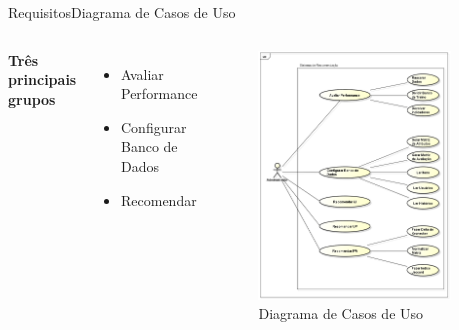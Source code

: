 \begin{frame}{Requisitos}{Diagrama de Casos de Uso}
\begin{columns}[c]
\textbf{Três principais grupos}
	\begin{itemize}
		\item Avaliar Performance
		\item Configurar Banco de Dados
		\item Recomendar
	\end{itemize}
\begin{figure}[ht]
    \begin{center}
    \includegraphics[width=0.9\textwidth]{img/CasosDeUso}
    \end{center}
\caption{Diagrama de Casos de Uso}
\end{figure}
\end{columns}
\end{frame}


